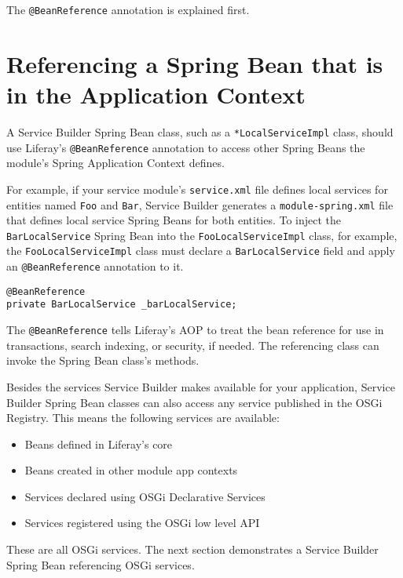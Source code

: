\noindent\hrulefill

The \texttt{@BeanReference} annotation is explained first.

\section{Referencing a Spring Bean that is in the Application
Context}\label{referencing-a-spring-bean-that-is-in-the-application-context}

A Service Builder Spring Bean class, such as a
\texttt{*LocalServiceImpl} class, should use Liferay's
\texttt{@BeanReference} annotation to access other Spring Beans the
module's Spring Application Context defines.

For example, if your service module's \texttt{service.xml} file defines
local services for entities named \texttt{Foo} and \texttt{Bar}, Service
Builder generates a \texttt{module-spring.xml} file that defines local
service Spring Beans for both entities. To inject the
\texttt{BarLocalService} Spring Bean into the
\texttt{FooLocalServiceImpl} class, for example, the
\texttt{FooLocalServiceImpl} class must declare a
\texttt{BarLocalService} field and apply an \texttt{@BeanReference}
annotation to it.

\begin{verbatim}
@BeanReference
private BarLocalService _barLocalService;
\end{verbatim}

The \texttt{@BeanReference} tells Liferay's AOP to treat the bean
reference for use in transactions, search indexing, or security, if
needed. The referencing class can invoke the Spring Bean class's
methods.

Besides the services Service Builder makes available for your
application, Service Builder Spring Bean classes can also access any
service published in the OSGi Registry. This means the following
services are available:

\begin{itemize}
\tightlist
\item
  Beans defined in Liferay's core
\item
  Beans created in other module app contexts
\item
  Services declared using OSGi Declarative Services
\item
  Services registered using the OSGi low level API
\end{itemize}

These are all OSGi services. The next section demonstrates a Service
Builder Spring Bean referencing OSGi services.

